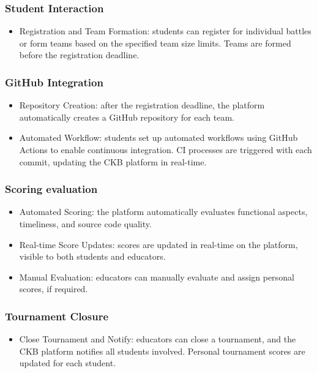 \subsubsection{Student Interaction}
\begin{itemize}
    \item Registration and Team Formation: students can register for individual battles or form teams based on the specified team size limits. Teams are formed before the registration deadline.
\end{itemize}

\subsubsection{GitHub Integration}
\begin{itemize}
    \item Repository Creation: after the registration deadline, the platform automatically creates a GitHub repository for each team.
    \item Automated Workflow: students set up automated workflows using GitHub Actions to enable continuous integration. CI processes are triggered with each commit, updating the CKB platform in real-time.
\end{itemize}

\subsubsection{Scoring evaluation}
\begin{itemize}
    \item Automated Scoring: the platform automatically evaluates functional aspects, timeliness, and source code quality.
    \item Real-time Score Updates: scores are updated in real-time on the platform, visible to both students and educators.
    \item Manual Evaluation: educators can manually evaluate and assign personal scores, if required.
\end{itemize}

\subsubsection{Tournament Closure}
\begin{itemize}
    \item Close Tournament and Notify: educators can close a tournament, and the CKB platform notifies all students involved. Personal tournament scores are updated for each student.
\end{itemize}

